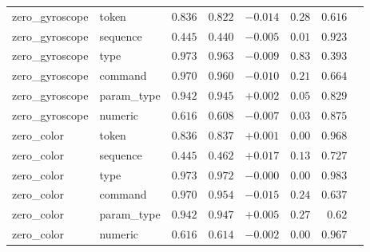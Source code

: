 \begin{table}[h]
\begin{tabular}{l l r r r r r c}
zero\_gyroscope & token & $0.836$ & $0.822$ & $-0.014$ & $0.28$ & $0.616$ &  \\
zero\_gyroscope & sequence & $0.445$ & $0.440$ & $-0.005$ & $0.01$ & $0.923$ &  \\
zero\_gyroscope & type & $0.973$ & $0.963$ & $-0.009$ & $0.83$ & $0.393$ &  \\
zero\_gyroscope & command & $0.970$ & $0.960$ & $-0.010$ & $0.21$ & $0.664$ &  \\
zero\_gyroscope & param\_type & $0.942$ & $0.945$ & $+0.002$ & $0.05$ & $0.829$ &  \\
zero\_gyroscope & numeric & $0.616$ & $0.608$ & $-0.007$ & $0.03$ & $0.875$ &  \\
zero\_color & token & $0.836$ & $0.837$ & $+0.001$ & $0.00$ & $0.968$ &  \\
zero\_color & sequence & $0.445$ & $0.462$ & $+0.017$ & $0.13$ & $0.727$ &  \\
zero\_color & type & $0.973$ & $0.972$ & $-0.000$ & $0.00$ & $0.983$ &  \\
zero\_color & command & $0.970$ & $0.954$ & $-0.015$ & $0.24$ & $0.637$ &  \\
zero\_color & param\_type & $0.942$ & $0.947$ & $+0.005$ & $0.27$ & $0.62$ &  \\
zero\_color & numeric & $0.616$ & $0.614$ & $-0.002$ & $0.00$ & $0.967$ &  \\
\bottomrule
\end{tabular}
\end{table}